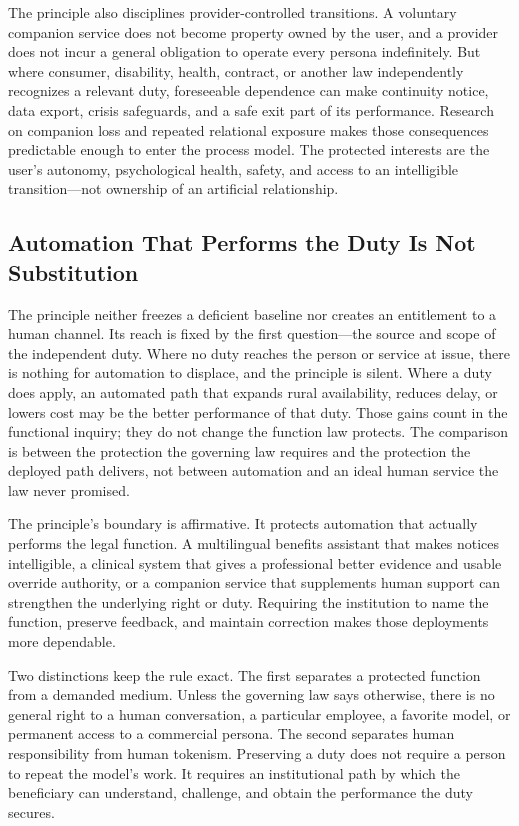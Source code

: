 The principle also disciplines provider-controlled transitions. A voluntary companion service does not become property owned by the user, and a provider does not incur a general obligation to operate every persona indefinitely. But where consumer, disability, health, contract, or another law independently recognizes a relevant duty, foreseeable dependence can make continuity notice, data export, crisis safeguards, and a safe exit part of its performance. Research on companion loss and repeated relational exposure makes those consequences predictable enough to enter the process model. The protected interests are the user's autonomy, psychological health, safety, and access to an intelligible transition---not ownership of an artificial relationship.

\subsection{Automation That Performs the Duty Is Not Substitution}

The principle neither freezes a deficient baseline nor creates an entitlement to a human channel. Its reach is fixed by the first question---the source and scope of the independent duty. Where no duty reaches the person or service at issue, there is nothing for automation to displace, and the principle is silent. Where a duty does apply, an automated path that expands rural availability, reduces delay, or lowers cost may be the better performance of that duty. Those gains count in the functional inquiry; they do not change the function law protects. The comparison is between the protection the governing law requires and the protection the deployed path delivers, not between automation and an ideal human service the law never promised.

The principle's boundary is affirmative. It protects automation that actually performs the legal function. A multilingual benefits assistant that makes notices intelligible, a clinical system that gives a professional better evidence and usable override authority, or a companion service that supplements human support can strengthen the underlying right or duty. Requiring the institution to name the function, preserve feedback, and maintain correction makes those deployments more dependable.

Two distinctions keep the rule exact. The first separates a protected function from a demanded medium. Unless the governing law says otherwise, there is no general right to a human conversation, a particular employee, a favorite model, or permanent access to a commercial persona. The second separates human responsibility from human tokenism. Preserving a duty does not require a person to repeat the model's work. It requires an institutional path by which the beneficiary can understand, challenge, and obtain the performance the duty secures.

